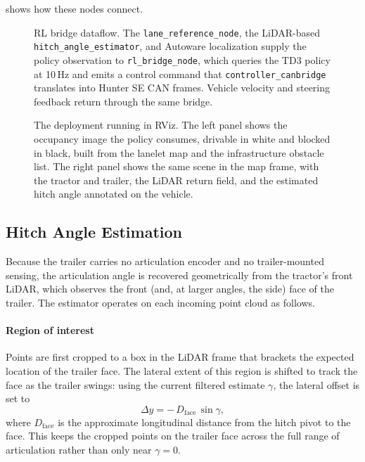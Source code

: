  shows how these nodes connect.

\begin{figure}[t]
  \centering
  \resizebox{\textwidth}{!}{}
  \caption{RL bridge dataflow. The \texttt{lane\_reference\_node}, the LiDAR-based \texttt{hitch\_angle\_estimator}, and Autoware localization supply the policy observation to \texttt{rl\_bridge\_node}, which queries the TD3 policy at 10\,Hz and emits a control command that \texttt{controller\_canbridge} translates into Hunter SE CAN frames. Vehicle velocity and steering feedback return through the same bridge.}
  \label{fig:rl_bridge}
\end{figure}

\begin{figure}[H]
  \centering
  \caption{The deployment running in RViz. The left panel shows the occupancy image the policy consumes, drivable in white and blocked in black, built from the lanelet map and the infrastructure obstacle list. The right panel shows the same scene in the map frame, with the tractor and trailer, the LiDAR return field, and the estimated hitch angle annotated on the vehicle.}
  \label{fig:rviz_deployment}
\end{figure}

\subsection{Hitch Angle Estimation}
\label{sec:hitch_estimation}

Because the trailer carries no articulation encoder and no trailer-mounted sensing, the articulation angle is recovered geometrically from the tractor's front LiDAR, which observes the front (and, at larger angles, the side) face of the trailer. The estimator operates on each incoming point cloud as follows.

\paragraph{Region of interest} Points are first cropped to a box in the LiDAR frame that brackets the expected location of the trailer face. The lateral extent of this region is shifted to track the face as the trailer swings: using the current filtered estimate $\gamma$, the lateral offset is set to
\begin{equation}
    \Delta y = -\,D_\text{face}\,\sin\gamma,
    \label{eq:hitch_roi_shift}
\end{equation}
where $D_\text{face}$ is the approximate longitudinal distance from the hitch pivot to the face. This keeps the cropped points on the trailer face across the full range of articulation rather than only near $\gamma = 0$.

